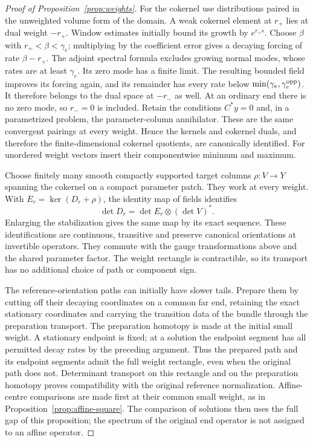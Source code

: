 \documentclass[11pt]{amsart}
\theoremstyle{definition}
\theoremstyle{remark}
\theoremstyle{plain}
\numberwithin{equation}{section}
\begin{document}
\begin{proof}[Proof of Proposition~\ref{prop:weights}]
For the cokernel use distributions paired in the unweighted
volume form of the domain. A weak cokernel element at $r_+$ lies at
dual weight $-r_+$. Window estimates initially bound its growth by
$e^{r_+s}$. Choose $\beta$ with $r_+<\beta<\gamma_e$; multiplying
by the coefficient error gives a decaying forcing of rate
$\beta-r_+$. The adjoint spectral formula excludes growing
normal modes, whose rates are at least $\gamma_e$. Its zero
mode has a finite limit. The resulting bounded field improves
its forcing again, and its remainder has every rate below
$\min(\gamma_e,\gamma_e^{\rm opp})$. It therefore belongs to
the dual space at $-r_-$ as well. At an ordinary end there is
no zero mode, so $r_-=0$ is included. Retain the conditions
$C^*y=0$ and, in a parametrized problem, the parameter-column
annihilator. These are the same convergent pairings
at every weight. Hence the kernels and cokernel duals, and
therefore the finite-dimensional cokernel quotients, are canonically
identified. For unordered weight vectors insert their componentwise
minimum and maximum.

Choose finitely many smooth compactly supported target columns
$\rho:V\to Y$ spanning the cokernel on a compact parameter patch.
They work at every weight. With $E_r=\ker(D_r+\rho)$, the identity
map of fields identifies
\[
 \det D_r=\det E_r\otimes(\det V)^*.
\]
Enlarging the stabilization gives the same map by its exact
sequence. These identifications are continuous, transitive and
preserve canonical orientations at invertible operators. They
commute with the gauge transformations above and the shared parameter
factor. The weight rectangle is contractible, so its transport
has no additional choice of path or component sign.

The reference-orientation paths can initially have slower tails.
Prepare them by cutting off their decaying coordinates on a common
far end, retaining the exact stationary coordinates and carrying the
transition data of the bundle through the preparation transport. The
preparation homotopy is made at the initial small weight. A
stationary endpoint is fixed; at a solution the endpoint segment has
all permitted decay rates by the preceding argument. Thus the prepared
path and its endpoint segments admit the full weight rectangle, even
when the original path does not. Determinant transport on this
rectangle and on the preparation homotopy proves compatibility with
the original reference normalization. Affine-centre comparisons are
made first at their common small weight, as in
Proposition~\ref{prop:affine-square}. The comparison of solutions then
uses the full gap of this proposition; the spectrum of the original
end operator is not assigned to an affine operator.


\end{proof}
\end{document}
